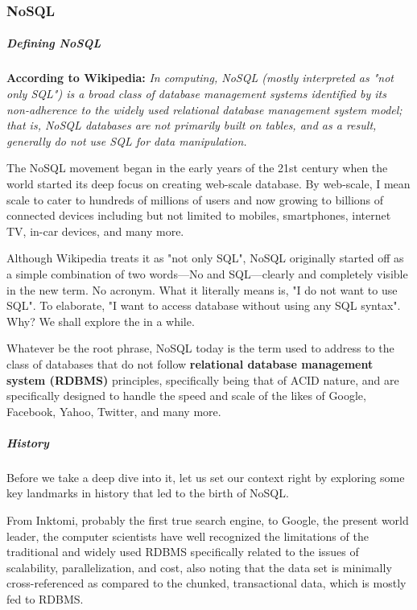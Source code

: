 \subsubsection{NoSQL}
\subparagraph*{Defining NoSQL}
\hfill \break
\textbf{According to Wikipedia:}
\textit{In computing, NoSQL (mostly interpreted as "not only SQL") is a broad
class of database management systems identified by its non-adherence to the
widely used relational database management system model; that is, NoSQL
databases are not primarily built on tables, and as a result, generally do not
use SQL for data manipulation.}\cite{8}


The NoSQL movement began in the early years of the 21st century when the world
started its deep focus on creating web-scale database. By web-scale, I mean scale to
cater to hundreds of millions of users and now growing to billions of connected
devices including but not limited to mobiles, smartphones, internet TV, in-car
devices, and many more.\cite{8}

Although Wikipedia treats it as "not only SQL", NoSQL originally started off as a
simple combination of two words—No and SQL—clearly and completely visible in
the new term. No acronym. What it literally means is, "I do not want to use SQL".
To elaborate, "I want to access database without using any SQL syntax". Why? We
shall explore the in a while.\cite{8}

Whatever be the root phrase, NoSQL today is the term used to address to the class
of databases that do not follow \textbf{relational database management system (RDBMS)}
principles, specifically being that of ACID nature, and are specifically designed to
handle the speed and scale of the likes of Google, Facebook, Yahoo, Twitter, and
many more.

\subparagraph*{History}
\hfill \break
Before we take a deep dive into it, let us set our context right by exploring some key
landmarks in history that led to the birth of NoSQL.\cite{8}

From Inktomi, probably the first true search engine, to Google, the present
world leader, the computer scientists have well recognized the limitations of the
traditional and widely used RDBMS specifically related to the issues of scalability,
parallelization, and cost, also noting that the data set is minimally cross-referenced
as compared to the chunked, transactional data, which is mostly fed to RDBMS.\cite{8}

